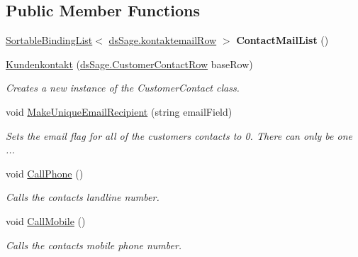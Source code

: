 \subsection*{Public Member Functions}
\begin{DoxyCompactItemize}
\item 
\hyperlink{class_products_1_1_common_1_1_sortable_binding_list}{Sortable\+Binding\+List}$<$ \hyperlink{class_products_1_1_data_1_1ds_sage_1_1kontaktemail_row}{ds\+Sage.\+kontaktemail\+Row} $>$ {\bfseries Contact\+Mail\+List} ()\hypertarget{class_products_1_1_model_1_1_entities_1_1_kundenkontakt_afbace86d13f58b393075641fc0c8305b}{}\label{class_products_1_1_model_1_1_entities_1_1_kundenkontakt_afbace86d13f58b393075641fc0c8305b}

\item 
\hyperlink{class_products_1_1_model_1_1_entities_1_1_kundenkontakt_a025c44276bf21288def1c46aea8cc912}{Kundenkontakt} (\hyperlink{class_products_1_1_data_1_1ds_sage_1_1_customer_contact_row}{ds\+Sage.\+Customer\+Contact\+Row} base\+Row)
\begin{DoxyCompactList}\small\item\em Creates a new instance of the Customer\+Contact class. \end{DoxyCompactList}\item 
void \hyperlink{class_products_1_1_model_1_1_entities_1_1_kundenkontakt_a6e49d7a12a17be6779413e7636ed434b}{Make\+Unique\+Email\+Recipient} (string email\+Field)
\begin{DoxyCompactList}\small\item\em Sets the email flag for all of the customer\textquotesingle{}s contacts to 0. There can only be one ... \end{DoxyCompactList}\item 
void \hyperlink{class_products_1_1_model_1_1_entities_1_1_kundenkontakt_a5e2d79b8e0e09f68e1f280aeb716925d}{Call\+Phone} ()
\begin{DoxyCompactList}\small\item\em Calls the contacts\textquotesingle{} landline number. \end{DoxyCompactList}\item 
void \hyperlink{class_products_1_1_model_1_1_entities_1_1_kundenkontakt_a36e8ba24f3910fd11428b104d89b4fde}{Call\+Mobile} ()
\begin{DoxyCompactList}\small\item\em Calls the contacts mobile phone number. \end{DoxyCompactList}\end{DoxyCompactItemize}
